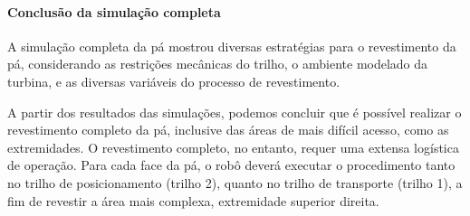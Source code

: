 \paragraph{Conclusão da simulação completa}

A simulação completa da pá mostrou diversas estratégias para o revestimento da
pá, considerando as restrições mecânicas do trilho, o ambiente modelado da
turbina, e as diversas variáveis do processo de revestimento.

A partir dos resultados das simulações, podemos concluir que é possível realizar
o revestimento completo da pá, inclusive das áreas de mais difícil acesso, como
as extremidades. O revestimento completo, no entanto, requer uma extensa
logística de operação. Para cada face da pá, o robô deverá executar o
procedimento tanto no trilho de posicionamento (trilho 2), quanto no trilho de
transporte (trilho 1), a fim de revestir a área mais complexa, extremidade
superior direita. 